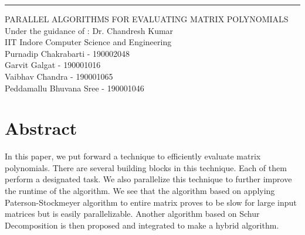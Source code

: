 \documentclass{article}
\begin{document}
\begin{flushright}
   \rule{14cm}{5pt}\vskip1cm
    \begin{bfseries}
        \Huge{PARALLEL ALGORITHMS FOR EVALUATING MATRIX POLYNOMIALS }\\
        \vspace{1.5cm}
        \LARGE{Under the guidance of : Dr. Chandresh Kumar}\\
        \vspace{1.5cm}
         IIT Indore Computer Science and Engineering\\
        \vspace{1.5cm}
         Purnadip Chakrabarti      - 190002048\\
         Garvit Galgat         - 190001016\\
         Vaibhav Chandra       - 190001065\\
         Peddamallu Bhuvana Sree - 190001046\\
         \vspace{1.5cm}
    \end{bfseries}
\end{flushright}


\section{Abstract}
In this paper, we put forward a technique to efficiently evaluate matrix polynomials. There are several building blocks in this technique. Each of them perform a designated task. We also parallelize this technique to further improve the runtime of the algorithm. We see that the algorithm based on applying Paterson-Stockmeyer algorithm to entire matrix proves to be slow for large input matrices but is easily parallelizable. Another algorithm based on Schur Decomposition is then proposed and integrated to make a hybrid algorithm.
\end{document}
